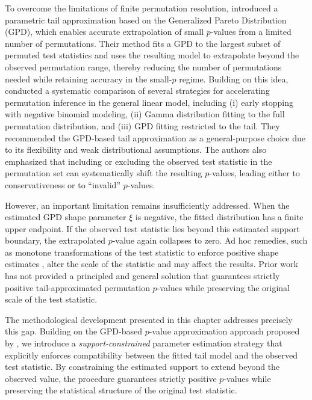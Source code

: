 To overcome the limitations of finite permutation resolution, \citet{knijnenburg2009fewer} introduced a parametric tail approximation based on the Generalized Pareto Distribution (GPD), which enables accurate extrapolation of small $p$-values from a limited number of permutations. Their method fits a GPD to the largest subset of permuted test statistics and uses the resulting model to extrapolate beyond the observed permutation range, thereby reducing the number of permutations needed while retaining accuracy in the small-$p$ regime. Building on this idea, \citet{winkler2016faster} conducted a systematic comparison of several strategies for accelerating permutation inference in the general linear model, including (i) early stopping with negative binomial modeling, (ii) Gamma distribution fitting to the full permutation distribution, and (iii) GPD fitting restricted to the tail. They recommended the GPD-based tail approximation as a general-purpose choice due to its flexibility and weak distributional assumptions. The authors also emphasized that including or excluding the observed test statistic in the permutation set can systematically shift the resulting $p$-values, leading either to conservativeness or to ``invalid'' $p$-values.

However, an important limitation remains insufficiently addressed. When the estimated GPD shape parameter $\xi$ is negative, the fitted distribution has a finite upper endpoint. If the observed test statistic lies beyond this estimated support boundary, the extrapolated $p$-value again collapses to zero. Ad hoc remedies, such as monotone transformations of the test statistic to enforce positive shape estimates \citep{knijnenburg2009fewer}, alter the scale of the statistic and may affect the results. Prior work has not provided a principled and general solution that guarantees strictly positive tail-approximated permutation $p$-values while preserving the original scale of the test statistic.

The methodological development presented in this chapter addresses precisely this gap. Building on the GPD-based $p$-value approximation approach proposed by \citet{knijnenburg2009fewer}, we introduce a \emph{support-constrained} parameter estimation strategy that explicitly enforces compatibility between the fitted tail model and the observed test statistic. By constraining the estimated support to extend beyond the observed value, the procedure guarantees strictly positive $p$-values while preserving the statistical structure of the original test statistic.

